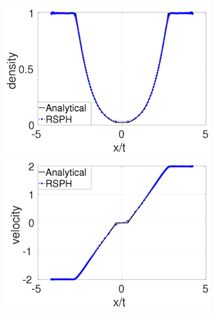 \documentclass[review]{elsarticle}
\begin{document}
\begin{figure}[H]
    \begin{minipage}{.415\textwidth}
        \centering
        \includegraphics[width=0.99 \textwidth]{./Figures/Sjogreen-RCM-rho-Adpt1}
    \end{minipage}%
    \begin{minipage}{.415 \textwidth}
        \centering
        \includegraphics[width=0.99 \textwidth]{./Figures/Sjogreen-RCM-v-Adpt1}
    \end{minipage}%
    \\
    \begin{minipage}{.415\textwidth}
        \centering

\end{minipage}
\end{figure}
\end{document}
